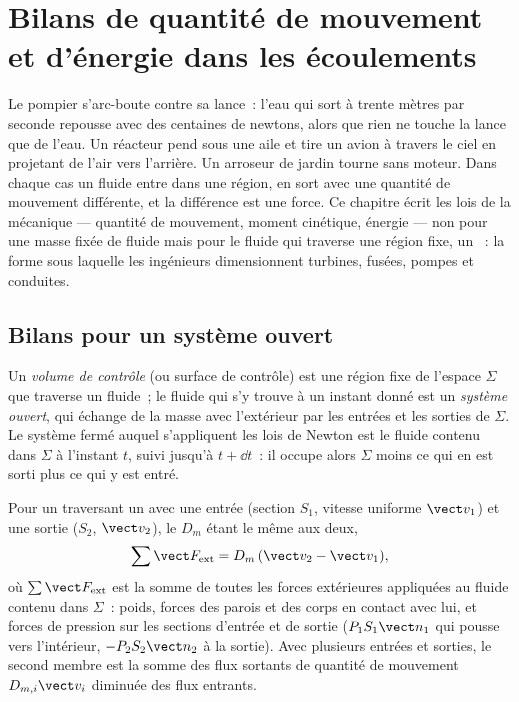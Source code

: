 \chapter{Bilans de quantité de mouvement et d'énergie dans les écoulements}\label{ch:b2:flow-balances}

Le pompier s'arc-boute contre sa lance~: l'eau qui sort à trente
mètres par seconde repousse avec des centaines de newtons, alors que rien
ne touche la lance que de l'eau. Un réacteur pend sous une aile et tire
un avion à travers le ciel en projetant de l'air vers l'arrière. Un
arroseur de jardin tourne sans moteur. Dans chaque cas un fluide entre dans une région,
en sort avec une quantité de mouvement différente, et la différence est une force.
Ce chapitre écrit les lois de la mécanique --- quantité de mouvement, moment
cinétique, énergie --- non pour une masse fixée de fluide mais pour le fluide
qui traverse une région fixe, un \emph{}~: la forme sous laquelle les
ingénieurs dimensionnent turbines, fusées, pompes et conduites.

\section{Bilans pour un système ouvert}

\begin{definition}\label{def:b2:flow-balances:cv}
Un \emph{volume de contrôle} (ou surface de contrôle) est une région fixe de l'espace
$\Sigma$ que traverse un fluide~; le fluide qui s'y trouve à un instant donné
est un \emph{système ouvert}, qui échange de la masse avec l'extérieur par
les entrées et les sorties de $\Sigma$. Le système fermé auquel s'appliquent les lois
de Newton est le fluide contenu dans $\Sigma$ à l'instant $t$, suivi
jusqu'à $t + \dd t$~: il occupe alors $\Sigma$ moins ce qui en est sorti plus ce qui
y est entré.
\end{definition}

\begin{theorem}\label{thm:b2:flow-balances:momentum}
Pour un  traversant un  avec une entrée (section
$S_1$, vitesse uniforme $\vect v_1$) et une sortie ($S_2$, $\vect v_2$), le
 $D_m$ étant le même aux deux,
\[
\sum\vect F_{\text{ext}} = D_m\,(\vect v_2 - \vect v_1) ,
\]
où $\sum\vect F_{\text{ext}}$ est la somme de toutes les forces extérieures appliquées au
fluide contenu dans $\Sigma$~: poids, forces des parois et des corps en contact
avec lui, et forces de pression sur les sections d'entrée et de sortie
($P_1S_1\vect n_1$ qui pousse vers l'intérieur, $-P_2S_2\vect n_2$ à la sortie). Avec
plusieurs entrées et sorties, le second membre est la somme des flux sortants
de quantité de mouvement $D_{m,i}\vect v_i$ diminuée des flux entrants.
\end{theorem}

